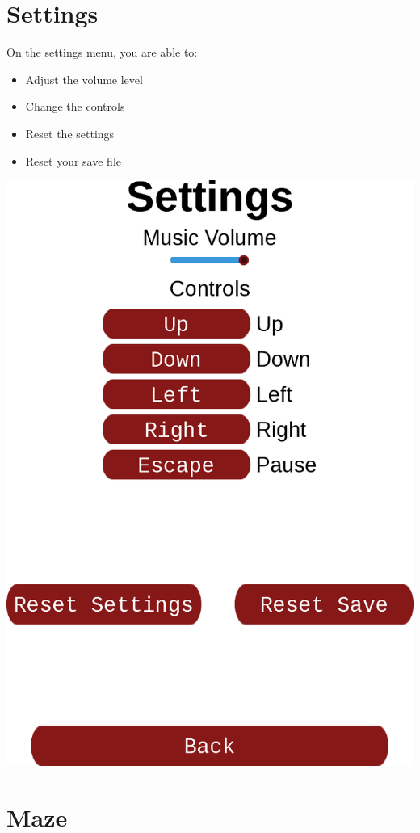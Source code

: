 \documentclass[12pt]{book}
\begin{document}
	\chapter{Settings}
		On the settings menu, you are able to:
		\begin{itemize}
			\item Adjust the volume level
			\item Change the controls
			\item Reset the settings
			\item Reset your save file
		\end{itemize}
		\newpage
		\includegraphics[width=\textwidth]{SettingsScreen}
	\chapter{Maze}
\end{document}
